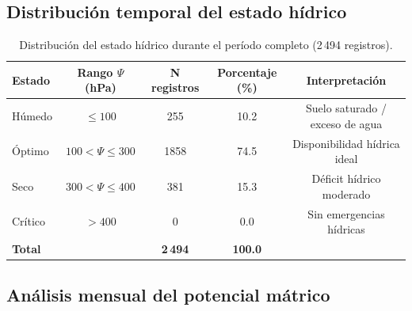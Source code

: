 \documentclass[12pt,a4paper]{article}
\begin{document}
\subsection{Distribución temporal del estado hídrico}

\begin{table}[H]
\centering
\small
\caption{Distribución del estado hídrico durante el período completo (2\,494 registros).}
\label{tab:distribucion_estados}
\begin{tabular}{@{}lcccc@{}}
\toprule
\textbf{Estado} & \textbf{Rango $\Psi$ (hPa)} & \textbf{N registros} & \textbf{Porcentaje (\%)} & \textbf{Interpretación} \\
\midrule
\cellcolor{azulPrimario!20}Húmedo & $\leq 100$ & 255 & 10.2 & Suelo saturado / exceso de agua \\
\cellcolor{verdeKPI!20}Óptimo & $100 < \Psi \leq 300$ & 1858 & 74.5 & Disponibilidad hídrica ideal \\
\cellcolor{naranjaMeta!20}Seco & $300 < \Psi \leq 400$ & 381 & 15.3 & Déficit hídrico moderado \\
\cellcolor{rojoKPI!20}Crítico & $> 400$ & 0 & 0.0 & Sin emergencias hídricas \\
\midrule
\textbf{Total} & & \textbf{2\,494} & \textbf{100.0} & \\
\bottomrule
\end{tabular}
\end{table}

\subsection{Análisis mensual del potencial mátrico}

\begin{table}[H]
\centering
\small
\caption{Resumen mensual del potencial mátrico $\Psi$ en la parcela JKI.}
\label{tab:mensual}
\end{table}
\end{document}
